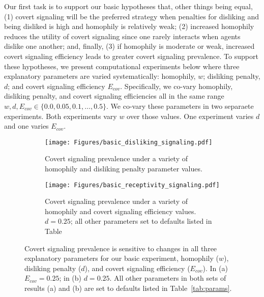 \documentclass[11pt,letterpaper]{article}
\begin{document}

Our first task is to support our basic hypotheses that, other
things being equal, (1) covert signaling will
be the preferred strategy when penalties for disliking and 
being disliked is high and homophily is relatively weak; (2) increased homophily reduces the utility of
covert signaling since one rarely interacts when agents dislike one another;
and, finally, (3) if homophily is moderate or weak, increased covert signaling
efficiency leads to greater covert signaling prevalence.
To support these hypotheses, we present computational experiments below where
three explanatory parameters are varied systematically: homophily, $w$; 
disliking penalty, $d$; and covert signaling efficiency $E_{cov}$. 
Specifically, we co-vary homophily, disliking penalty, and covert signaling
efficiencies all in the same range $w,d,E_{cov} \in \{0.0, 0.05, 0.1, \ldots, 0.5\}$.
We co-vary these parameters in two separaete experiments. Both experiments
vary $w$ over those values. One experiment varies $d$ and one varies $E_{cov}$.

\begin{figure}[H]
  \centering
  \begin{subfigure}{0.49\textwidth}
    \centering
    \texttt{[image: Figures/basic\_disliking\_signaling.pdf]}
    \caption{Covert signaling prevalence under a variety of homophily and
    disliking penalty parameter values. }
  \end{subfigure}
  \begin{subfigure}{0.49\textwidth}
    \centering
    \texttt{[image: Figures/basic\_receptivity\_signaling.pdf]}
    \caption{Covert signaling prevalence under a variety of homophily and
    covert signaling efficiency values. $d=0.25$; all other parameters set to
  defaults listed in Table~}
  \end{subfigure}
  
  \caption{Covert signaling prevalence is sensitive to changes in all 
  three explanatory parameters for our basic experiment, homophily ($w$),
disliking penalty ($d$), and covert signaling efficiency ($E_{cov}$). 
In (a) $E_{cov}=0.25$; in (b) $d=0.25$. All other parameters in both sets of 
    results (a) and (b) are set to defaults listed in Table~\ref{tab:params}.}
  \label{fig:dislikingHomophilyHeatmap}
\end{figure}
\end{document}
